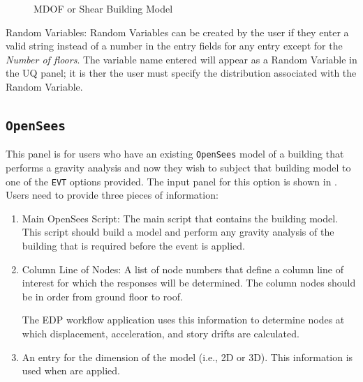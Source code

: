 \begin{figure}[!htbp]
  \caption{MDOF or Shear Building Model}
  \label{fig:mdof}
\end{figure}

Random Variables: Random Variables can be created by the user if they enter
a valid string instead of a number in the entry fields for any entry
except for the \emph{Number of floors}. The variable name entered will appear as
a Random Variable in the UQ panel; it is ther the user must specify the distribution 
associated with the Random Variable.

\subsection{\texttt{OpenSees}}\label{sec:OpenSeesSIM}
This panel is for users who have an existing \texttt{OpenSees} model of a
building that performs a gravity analysis and now they wish to subject that
building model to one of the \texttt{EVT} options provided. The input panel
for this option is shown in . Users need to provide three pieces of information:
\begin{enumerate} 
\item Main OpenSees Script: The main script that contains the building
  model. This script should build a model and perform any gravity
  analysis of the building that is required before the event is
  applied.
\item Column Line of Nodes: A list of node numbers that define a column line of interest for which
  the responses will be determined. The column nodes should be in
  order from ground floor to roof. 
  
  The EDP workflow application uses this information to determine nodes at which
  displacement, acceleration, and story drifts are calculated.
\item An entry for the dimension of the model (i.e., 2D or 3D). This
  information is used when  are applied.
\end{enumerate}


